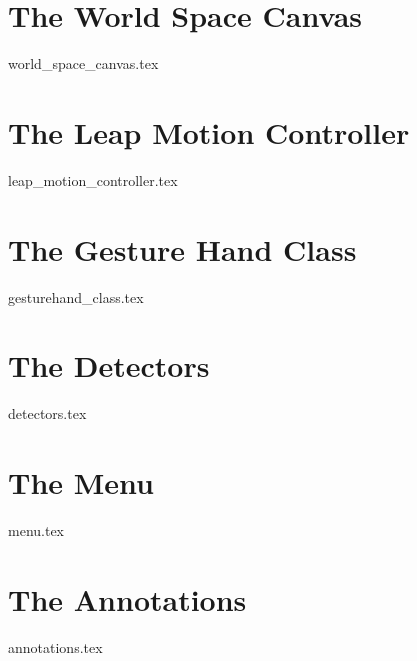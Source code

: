 \section{The World Space Canvas}
\label{sec:world_space_canvas}
{world_space_canvas.tex}


\section{The Leap Motion Controller}
\label{sec:leap_motion_controller}
{leap_motion_controller.tex}


\section{The Gesture Hand Class}
\label{sec:gesturehand_class}
{gesturehand_class.tex}
 

\section{The Detectors}
\label{sec:detectors}
{detectors.tex}


\section{The Menu}
\label{sec:menu}
{menu.tex}


\section{The Annotations}
\label{sec:annotations}
{annotations.tex}


